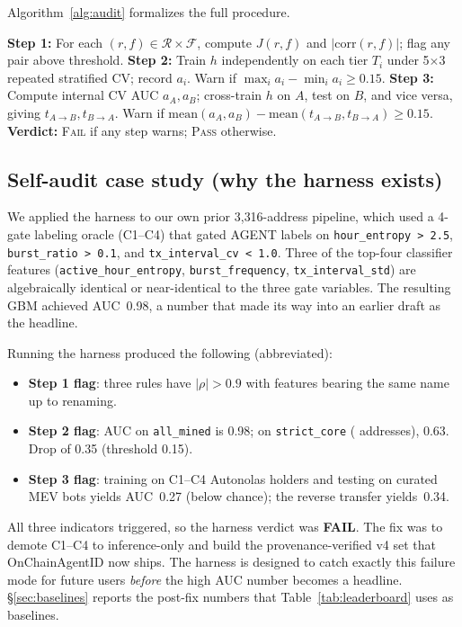 \documentclass[10pt]{article}
\begin{document}
Algorithm~\ref{alg:audit} formalizes the full procedure.

\begin{algorithm}[t]
\small
\SetAlgoLined
{}

\textbf{Step 1:} For each $(r,f) \in \mathcal{R}\times\mathcal{F}$, compute $J(r,f)$ and $|\text{corr}(r,f)|$; flag any pair above threshold.\;
\textbf{Step 2:} Train $h$ independently on each tier $T_i$ under 5$\times$3 repeated stratified CV; record $a_i$. Warn if $\max_i a_i - \min_i a_i \geq 0.15$.\;
\textbf{Step 3:} Compute internal CV AUC $a_A, a_B$; cross-train $h$ on $A$, test on $B$, and vice versa, giving $t_{A\to B}, t_{B\to A}$. Warn if $\mathrm{mean}(a_A,a_B) - \mathrm{mean}(t_{A\to B}, t_{B\to A}) \geq 0.15$.\;
\textbf{Verdict:} \textsc{Fail} if any step warns; \textsc{Pass} otherwise.\;
\caption{\texttt{generate\_audit\_report}: three-step leakage audit.}
\label{alg:audit}
\end{algorithm}

\subsection{Self-audit case study (why the harness exists)}

We applied the harness to our own prior 3{,}316-address pipeline, which used a 4-gate labeling oracle (C1--C4) that gated AGENT labels on \texttt{hour\_entropy~>~2.5}, \texttt{burst\_ratio~>~0.1}, and \texttt{tx\_interval\_cv~<~1.0}. Three of the top-four classifier features (\texttt{active\_hour\_entropy}, \texttt{burst\_frequency}, \texttt{tx\_interval\_std}) are algebraically identical or near-identical to the three gate variables. The resulting GBM achieved AUC~0.98, a number that made its way into an earlier draft as the headline.

Running the harness produced the following (abbreviated):
\begin{itemize}
    \item \textbf{Step 1 flag}: three rules have $|\rho| > 0.9$ with features bearing the same name up to renaming.
    \item \textbf{Step 2 flag}: AUC on \texttt{all\_mined} is 0.98; on \texttt{strict\_core} (\datasetStrictCoreN{} addresses), 0.63. Drop of 0.35 (threshold 0.15).
    \item \textbf{Step 3 flag}: training on C1--C4 Autonolas holders and testing on curated MEV bots yields AUC~0.27 (below chance); the reverse transfer yields~0.34.
\end{itemize}
All three indicators triggered, so the harness verdict was \textbf{FAIL}. The fix was to demote C1--C4 to inference-only and build the provenance-verified v4 set that OnChainAgentID now ships. The harness is designed to catch exactly this failure mode for future users \emph{before} the high AUC number becomes a headline. \S\ref{sec:baselines} reports the post-fix numbers that Table~\ref{tab:leaderboard} uses as baselines.
\end{document}
